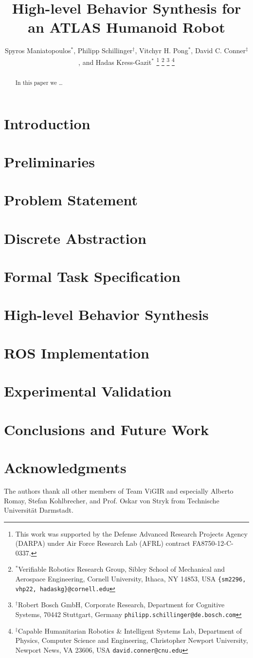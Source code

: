 \documentclass[letterpaper, 10 pt, conference]{ieeeconf}	%
\title{\LARGE \bf
	High-level Behavior Synthesis for an ATLAS Humanoid Robot
}
\author{Spyros Maniatopoulos$^{*}$, Philipp Schillinger$^{\dagger}$, Vitchyr H. Pong$^{*}$, David C. Conner$^{\ddagger}$, and Hadas Kress-Gazit$^{*}$%
\thanks{This work was supported by the Defense Advanced Research Projects Agency (DARPA) under Air Force Research Lab (AFRL) contract FA8750-12-C-0337.}
\thanks{$^{*}$Verifiable Robotics Research Group, Sibley School of Mechanical and Aerospace Engineering, Cornell University, Ithaca, NY 14853, USA {\tt \{sm2296, vhp22, hadaskg\}\nolinkurl{@cornell.edu}}}
\thanks{$^{\dagger}$Robert Bosch GmbH, Corporate Research, Department for Cognitive Systems, 70442 Stuttgart, Germany {\tt philipp.schillinger\nolinkurl{@de.bosch.com}}}
\thanks{$^{\ddagger}$Capable Humanitarian Robotics \& Intelligent Systems Lab, Department of Physics, Computer Science and Engineering, Christopher Newport University, Newport News, VA 23606, USA {\tt david.conner\nolinkurl{@cnu.edu}}}
}%
\begin{document}
%
\maketitle
\thispagestyle{empty}
\pagestyle{empty}
%
\begin{abstract}
In this paper we \ldots
{}
\end{abstract}
%
%
\newpage
%
%
\section{Introduction}\label{S:intro}

%
\section{Preliminaries}\label{S:prelim}

%
\section{Problem Statement}\label{S:problem}

%
\section{Discrete Abstraction}\label{S:abstraction}

%
\section{Formal Task Specification}\label{S:ltl}

%
\section{High-level Behavior Synthesis}\label{S:synthesis}

%
\section{ROS Implementation}\label{S:implementation}

%
\section{Experimental Validation}\label{S:experiments}

%
\section{Conclusions and Future Work}\label{S:conclusion}

%
\section*{Acknowledgments}
The authors thank all other members of Team ViGIR and especially Alberto Romay, Stefan Kohlbrecher, and Prof. Oskar von Stryk from Technische Universit\"{a}t Darmstadt.
%
%


%
\end{document}
